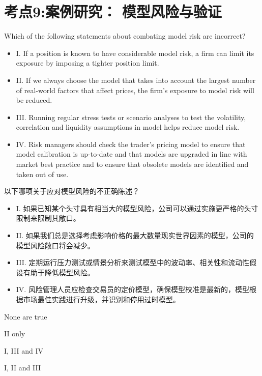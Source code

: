 \documentclass{article}
\newcounter{question} %
\begin{document}
\section{考点9:案例研究： 模型风险与验证}
\setcounter{question}{0}
\begin{question}
    Which of the following statements about combating model risk are incorrect?
    \begin{itemize}
    \item I. If a position is known to have considerable model risk, a firm can limit its exposure by imposing a tighter position limit.
    \item II. If we always choose the model that takes into account the largest number of real-world factors that affect prices, the firm’s exposure to model risk will be reduced.
    \item III. Running regular stress tests or scenario analyses to test the volatility, correlation and liquidity assumptions in model helps reduce model risk.
    \item IV. Risk managers should check the trader’s pricing model to ensure that model calibration is up-to-date and that models are upgraded in line with market best practice and to ensure that obsolete models are identified and taken out of use.
    \end{itemize}
    以下哪项关于应对模型风险的不正确陈述？
    \begin{itemize}
    \item I. 如果已知某个头寸具有相当大的模型风险，公司可以通过实施更严格的头寸限制来限制其敞口。
    \item II. 如果我们总是选择考虑影响价格的最大数量现实世界因素的模型，公司的模型风险敞口将会减少。
    \item III. 定期运行压力测试或情景分析来测试模型中的波动率、相关性和流动性假设有助于降低模型风险。
    \item IV. 风险管理人员应检查交易员的定价模型，确保模型校准是最新的，模型根据市场最佳实践进行升级，并识别和停用过时模型。
    \end{itemize}
\end{question}

\begin{choices}
    \item None are true
    \item II only
    \item I, III and IV
    \item I, II and III
\end{choices}
\end{document}
